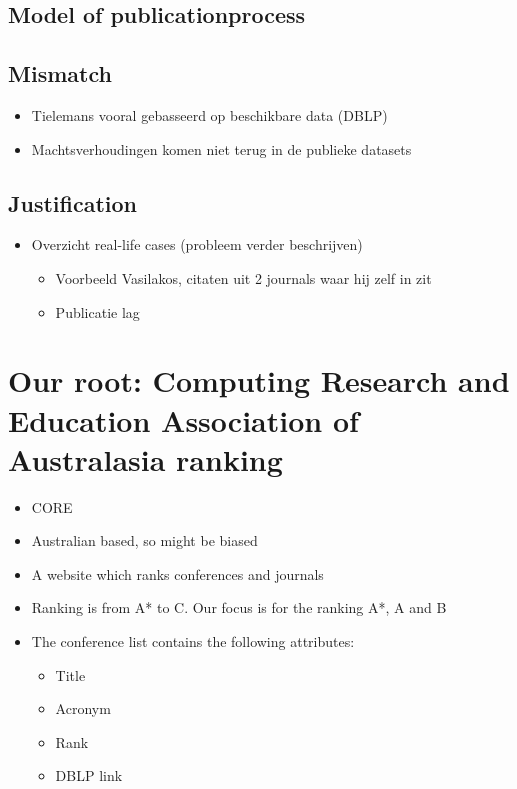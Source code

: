 {{\subsection{Model of publicationprocess}
\subsection{Mismatch}
\begin{itemize}
    \item Tielemans vooral gebasseerd op beschikbare data (DBLP)
    \item Machtsverhoudingen komen niet terug in de publieke datasets
\end{itemize}
\subsection{Justification}
\begin{itemize}
    \item Overzicht real-life cases (probleem verder beschrijven)
    \begin{itemize}
        \item Voorbeeld Vasilakos, citaten uit 2 journals waar hij zelf in zit
        \item Publicatie lag
    \end{itemize}

\end{itemize}
}

\section{Our root: Computing Research and Education Association of Australasia ranking}
\begin{itemize}
    \item CORE
    \item Australian based, so might be biased
    \item A website which ranks conferences and journals
    \item Ranking is from A* to C. Our focus is for the ranking A*, A and B
    \item The conference list contains the following attributes:
    \begin{itemize}
        \item Title
        \item Acronym
        \item Rank
        \item DBLP link
    \end{itemize}
\end{itemize}
}
